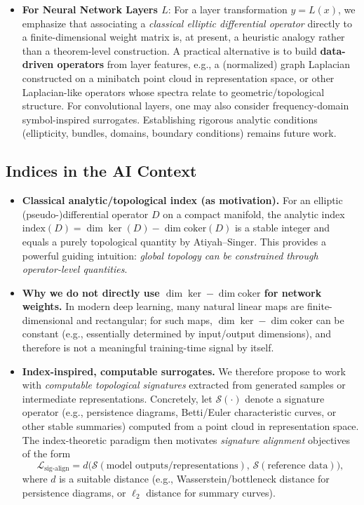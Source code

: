 \documentclass[10pt,leqno]{amsart}
\begin{document}
\begin{itemize}
\begin{itemize}
    \item \textbf{For Neural Network Layers $L$}: For a layer transformation $y = L(x)$, we emphasize that associating a \emph{classical elliptic differential operator} directly to a finite-dimensional weight matrix is, at present, a heuristic analogy rather than a theorem-level construction. A practical alternative is to build \textbf{data-driven operators} from layer features, e.g., a (normalized) graph Laplacian constructed on a minibatch point cloud in representation space, or other Laplacian-like operators whose spectra relate to geometric/topological structure. For convolutional layers, one may also consider frequency-domain symbol-inspired surrogates. Establishing rigorous analytic conditions (ellipticity, bundles, domains, boundary conditions) remains future work.
    \end{itemize}
\end{itemize}

\subsection{Indices in the AI Context}
\begin{itemize}
    \item \textbf{Classical analytic/topological index (as motivation).}
    For an elliptic (pseudo-)differential operator $D$ on a compact manifold, the analytic index $\mathrm{index}(D)=\dim\ker(D)-\dim\mathrm{coker}(D)$ is a stable integer and equals a purely topological quantity by Atiyah--Singer. This provides a powerful guiding intuition: \emph{global topology can be constrained through operator-level quantities}.

    \item \textbf{Why we do not directly use $\dim\ker-\dim\mathrm{coker}$ for network weights.}
    In modern deep learning, many natural linear maps are finite-dimensional and rectangular; for such maps, $\dim\ker-\dim\mathrm{coker}$ can be constant (e.g., essentially determined by input/output dimensions), and therefore is not a meaningful training-time signal by itself.

    \item \textbf{Index-inspired, computable surrogates.}
    We therefore propose to work with \emph{computable topological signatures} extracted from generated samples or intermediate representations. Concretely, let $\mathcal{S}(\cdot)$ denote a signature operator (e.g., persistence diagrams, Betti/Euler characteristic curves, or other stable summaries) computed from a point cloud in representation space. The index-theoretic paradigm then motivates \emph{signature alignment} objectives of the form
    \[
    \mathcal{L}_{\text{sig-align}} = d\!\big(\mathcal{S}(\text{model outputs/representations}),\, \mathcal{S}(\text{reference data})\big),
    \]
    where $d$ is a suitable distance (e.g., Wasserstein/bottleneck distance for persistence diagrams, or $\ell_2$ distance for summary curves).
\end{itemize}
\end{document}
